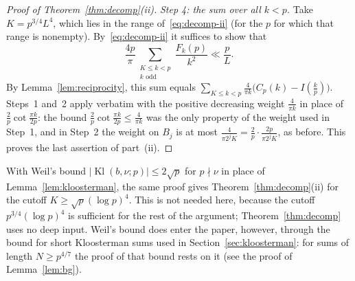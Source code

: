\begin{proof}[Proof of Theorem~\textup{\ref{thm:decomp}(ii)}]
\emph{Step 4: the sum over all $k<p$.} Take $K=p^{3/4}L^4$, which lies in the range of~\eqref{eq:decomp-ii} (for the $p$ for which that range is nonempty). By~\eqref{eq:decomp-ii} it suffices to show that
\[
\frac{4p}{\pi}\sum_{\substack{K\le k<p\\ k\text{ odd}}}\frac{F_k(p)}{k^2}\ll\frac p{L}.
\]
By Lemma~\ref{lem:reciprocity}, this sum equals $\sum_{K\le k<p}\frac4{\pi k}\bigl(C_p(k)-I(\frac kp)\bigr)$. Steps~1 and~2 apply verbatim with the positive decreasing weight $\frac4{\pi k}$ in place of $\frac2p\cot\frac{\pi k}{2p}$: the bound $\frac2p\cot\frac{\pi k}{2p}\le\frac4{\pi k}$ was the only property of the weight used in Step~1, and in Step~2 the weight on $B_j$ is at most $\frac4{\pi2^jK}=\frac2p\cdot\frac{2p}{\pi2^jK}$, as before. This proves the last assertion of part~(ii).
\end{proof}

\begin{remark}\label{rem:weil}
With Weil's bound $|\operatorname{Kl}(b,\nu;p)|\le2\sqrt p$ for $p\nmid\nu$ in place of Lemma~\ref{lem:kloosterman}, the same proof gives Theorem~\ref{thm:decomp}(ii) for the cutoff $K\ge\sqrt p(\log p)^4$. This is not needed here, because the cutoff $p^{3/4}(\log p)^4$ is sufficient for the rest of the argument; Theorem~\ref{thm:decomp} uses no deep input. Weil's bound does enter the paper, however, through the bound for short Kloosterman sums used in Section~\ref{sec:kloosterman}: for sums of length $N\ge p^{4/7}$ the proof of that bound rests on it (see the proof of Lemma~\ref{lem:bg}).
\end{remark}
